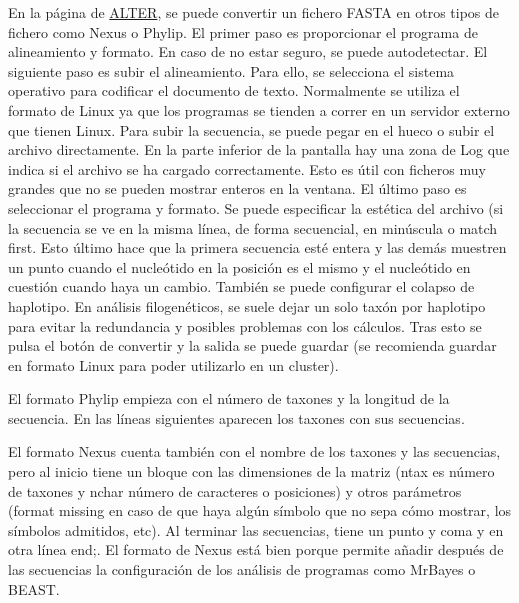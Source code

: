 En la página de \href{https://www.sing-group.org/ALTER/}{ALTER}, se puede convertir un fichero FASTA en otros tipos de fichero como Nexus o Phylip. El primer paso es proporcionar el programa de alineamiento y formato. En caso de no estar seguro, se puede autodetectar. El siguiente paso es subir el alineamiento. Para ello, se selecciona el sistema operativo para codificar el documento de texto. Normalmente se utiliza el formato de Linux ya que los programas se tienden a correr en un servidor externo que tienen Linux. Para subir la secuencia, se puede pegar en el hueco o subir el archivo directamente. En la parte inferior de la pantalla hay una zona de Log que indica si el archivo se ha cargado correctamente. Esto es útil con ficheros muy grandes que no se pueden mostrar enteros en la ventana. El último paso es seleccionar el programa y formato. Se puede especificar la estética del archivo (si la secuencia se ve en la misma línea, de forma secuencial, en minúscula o match first. Esto último hace que la primera secuencia esté entera y las demás muestren un punto cuando el nucleótido en la posición es el mismo y el nucleótido en cuestión cuando haya un cambio. También se puede configurar el colapso de haplotipo. En análisis filogenéticos, se suele dejar un solo taxón por haplotipo para evitar la redundancia y posibles problemas con los cálculos. Tras esto se pulsa el botón de convertir y la salida se puede guardar (se recomienda guardar en formato Linux para poder utilizarlo en un cluster).

El formato Phylip empieza con el número de taxones y la longitud de la secuencia. En las líneas siguientes aparecen los taxones con sus secuencias.

El formato Nexus cuenta también con el nombre de los taxones y las secuencias, pero al inicio tiene un bloque con las dimensiones de la matriz (ntax es número de taxones y nchar número de caracteres o posiciones) y otros parámetros (format missing en caso de que haya algún símbolo que no sepa cómo mostrar, los símbolos admitidos, etc). Al terminar las secuencias, tiene un punto y coma y en otra línea end;. El formato de Nexus está bien porque permite añadir después de las secuencias la configuración de los análisis de programas como MrBayes o BEAST. 